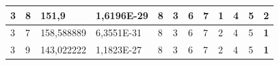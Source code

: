 \documentclass[conference]{IEEEtran}
\begin{document}
\begin{table}[]
\begin{tabular}{|llll|llllllll|}
\multicolumn{1}{|l|}{3}                                                     & \multicolumn{1}{l|}{8}                                                        & \multicolumn{1}{l|}{151,9}                                                        & 1,6196E-29                     & \multicolumn{1}{l|}{8}                                                  & \multicolumn{1}{l|}{3}                                                  & \multicolumn{1}{l|}{6}                                                  & \multicolumn{1}{l|}{7}                                                  & \multicolumn{1}{l|}{\textbf{1}}                                         & \multicolumn{1}{l|}{4}                                                  & \multicolumn{1}{l|}{5}                                                  & 2                          \\ \hline
\multicolumn{1}{|l|}{3}                                                     & \multicolumn{1}{l|}{7}                                                        & \multicolumn{1}{l|}{158,588889}                                                   & 6,3551E-31                     & \multicolumn{1}{l|}{8}                                                  & \multicolumn{1}{l|}{3}                                                  & \multicolumn{1}{l|}{6}                                                  & \multicolumn{1}{l|}{7}                                                  & \multicolumn{1}{l|}{2}                                                  & \multicolumn{1}{l|}{4}                                                  & \multicolumn{1}{l|}{5}                                                  & \textbf{1}                 \\ \hline
\multicolumn{1}{|l|}{3}                                                     & \multicolumn{1}{l|}{9}                                                        & \multicolumn{1}{l|}{143,022222}                                                   & 1,1823E-27                     & \multicolumn{1}{l|}{8}                                                  & \multicolumn{1}{l|}{3}                                                  & \multicolumn{1}{l|}{6}                                                  & \multicolumn{1}{l|}{7}                                                  & \multicolumn{1}{l|}{2}                                                  & \multicolumn{1}{l|}{4}                                                  & \multicolumn{1}{l|}{5}                                                  & \textbf{1}                 \\ \hline

\end{tabular}
\end{table}
\end{document}
